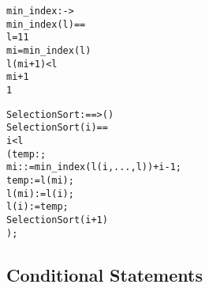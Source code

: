 \documentclass[\pformat,12pt]{article}
\begin{document}
\begin{description}
\begin{alltt}
  min_index :  -> 
  min_index(l) ==
   l = 1  1
   mi = min_index( l)
      l(mi+1) <  l
        mi+1
        1


  SelectionSort :  ==> ()
  SelectionSort (i) ==
     i <  l
     ( temp: ;
          mi :  := min_index(l(i,..., l)) + i - 1;
         temp := l(mi);
         l(mi) := l(i);
         l(i) := temp;
         SelectionSort(i+1)
        );
  \end{alltt}

\end{description}

\subsection{Conditional Statements}\label{condstmt}
\end{document}
